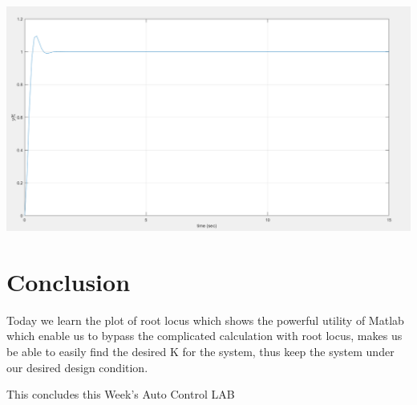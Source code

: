 \documentclass[12pt]{article}
\begin{document}
\includegraphics[scale=0.4]{../Lab12/Result2_Responses.png}\\ 


\section{Conclusion}
Today we learn the plot of root locus which shows the powerful utility of Matlab which enable us to bypass the complicated calculation with root locus, makes us be able to easily find the desired K for the system, thus keep the system under our desired design condition.

\begin{center} 
This concludes this Week's Auto Control LAB\\
\end{center}
\end{document}

